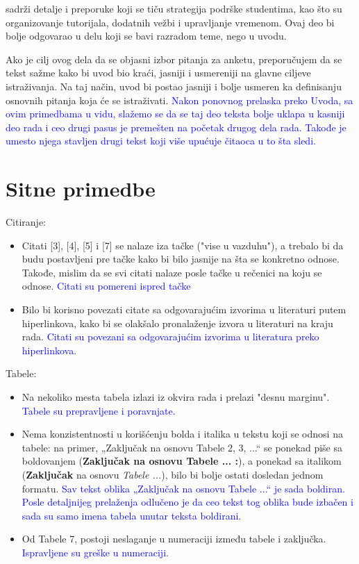 \documentclass[a4paper]{report}
\newcommand{\odgovor}[1]{\textcolor{blue}{#1}}
\begin{document}
sadrži detalje i preporuke koji se tiču strategija podrške studentima, kao što su organizovanje tutorijala, dodatnih vežbi i upravljanje vremenom. Ovaj deo bi bolje odgovarao u delu koji se bavi razradom teme, nego u uvodu. 
\newline

Ako je cilj ovog dela da se objasni izbor pitanja za anketu, preporučujem da se tekst sažme kako bi uvod bio kraći, jasniji i usmereniji na glavne ciljeve istraživanja. Na taj način, uvod bi postao jasniji i bolje usmeren ka definisanju osnovnih pitanja koja će se istraživati. \odgovor{Nakon ponovnog prelaska preko Uvoda, sa ovim primedbama u vidu, slažemo se da se taj deo teksta bolje uklapa u kasniji deo rada i ceo drugi pasus je premešten na početak drugog dela rada. Takođe je umesto njega stavljen drugi tekst koji više upućuje čitaoca u to šta sledi.}



\section{Sitne primedbe}

Citiranje:
\begin{itemize}
    \item Citati [3], [4], [5] i [7] se nalaze iza tačke ("vise u vazduhu"), a trebalo bi da budu postavljeni pre tačke kako bi bilo jasnije na šta se konkretno odnose. Takođe, mislim da se svi citati nalaze posle tačke u rečenici na koju se odnose. \odgovor{Citati su pomereni ispred tačke}
    \item Bilo bi korisno povezati citate sa odgovarajućim izvorima u literaturi putem hiperlinkova, kako bi se olakšalo pronalaženje izvora u literaturi na kraju rada. \odgovor{Citati su povezani sa odgovarajućim izvorima u literatura preko hiperlinkova.}
\end{itemize}

Tabele:
\begin{itemize}
    \item Na nekoliko mesta tabela izlazi iz okvira rada i prelazi "{}desnu marginu". \odgovor{Tabele su prepravljene i poravnjate.}
    \item Nema konzistentnosti u korišćenju bolda i italika u tekstu koji se odnosi na tabele: na primer, „Zaključak na osnovu Tabele 2, 3, ...“ se ponekad piše sa boldovanjem (\textbf{Zaključak na osnovu Tabele ... :}), a ponekad sa italikom (\textbf{Zaključak} na osnovu \textit{Tabele ...}), bilo bi bolje ostati dosledan jednom formatu. \odgovor{Sav tekst oblika  „Zaključak na osnovu Tabele ...“ je sada boldiran. Posle detaljnijeg prelaženja odlučeno je da ceo tekst tog oblika bude izbačen i sada su samo imena tabela unutar teksta boldirani.}
    \item Od Tabele 7, postoji neslaganje u numeraciji između tabele i zaključka. \odgovor{Ispravljene su greške u numeraciji.}
\end{itemize}
\end{document}

